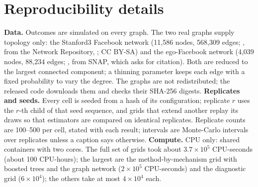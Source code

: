 \section{Reproducibility details}\label{app:repro}
\textbf{Data.} Outcomes are simulated on every graph. The two real graphs supply topology only: the Stanford3 Facebook network (11,586 nodes, 568,309 edges; \citealp{traud2012social}, from the Network Repository, \citealp{rossi2015network}; CC BY-SA) and the ego-Facebook network (4,039 nodes, 88,234 edges; \citealp{mcauley2012learning}, from SNAP, which asks for citation). Both are reduced to the largest connected component; a thinning parameter keeps each edge with a fixed probability to vary the degree. The graphs are not redistributed; the released code downloads them and checks their SHA-256 digests.
\textbf{Replicates and seeds.} Every cell is seeded from a hash of its configuration; replicate $r$ uses the $r$-th child of that seed sequence, and grids that extend another replay its draws so that estimators are compared on identical replicates. Replicate counts are 100--500 per cell, stated with each result; intervals are Monte-Carlo intervals over replicates unless a caption says otherwise.
\textbf{Compute.} CPU only: shared containers with two cores. The full set of grids took about $3.7\times10^5$ CPU-seconds (about 100 CPU-hours); the largest are the method-by-mechanism grid with boosted trees and the graph network ($2\times10^5$ CPU-seconds) and the diagnostic grid ($6\times10^4$); the others take at most $4\times10^4$ each.
